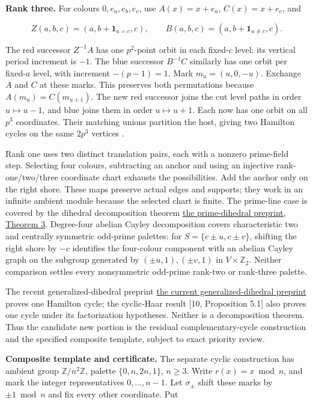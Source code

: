 \documentclass[smallextended]{svjour3}
\begin{document}
\textbf{Rank three.} For colours \(0,e_a,e_b,e_c\), use \(A(x)=x+e_a\),
\(C(x)=x+e_c\), and

\[
Z(a,b,c)=(a,b+\mathbf1_{a=c},c),\qquad
B(a,b,c)=(a,b+\mathbf1_{a\ne c},c).
\]

The red successor \(Z^{-1}A\) has one \(p^2\)-point orbit in each
fixed-\(c\) level: its vertical period increment is \(-1\). The blue
successor \(B^{-1}C\) similarly has one orbit per fixed-\(a\) level,
with increment \(-(p-1)=1\). Mark \(m_u=(u,0,-u)\). Exchange \(A\) and
\(C\) at these marks. This preserves both permutations because
\(A(m_u)=C(m_{u+1})\). The new red successor joins the cut level paths
in order \(u\mapsto u-1\), and blue joins them in order
\(u\mapsto u+1\). Each now has one orbit on all \(p^3\) coordinates.
Their matching unions partition the host, giving two Hamilton cycles on
the same \(2p^3\) vertices \cite{ref11}.

Rank one uses two distinct translation pairs, each with a nonzero
prime-field step. Selecting four colours, subtracting an anchor and
using an injective rank-one/two/three coordinate chart exhausts the
possibilities. Add the anchor only on the right shore. These maps
preserve actual edges and supports; they work in an infinite ambient
module because the selected chart is finite. The prime-line case is
covered by the dihedral decomposition theorem
\href{https://arxiv.org/html/1810.07866v1}{the prime-dihedral preprint,
Theorem 3}. Degree-four abelian Cayley decomposition \cite{ref6} covers
characteristic two and centrally symmetric odd-prime palettes: for
\(S=\{c\pm u,c\pm v\}\), shifting the right shore by \(-c\) identifies
the four-colour component with an abelian Cayley graph on the subgroup
generated by \((\pm u,1),(\pm v,1)\) in \(V\times\mathbb Z_2\). Neither
comparison settles every nonsymmetric odd-prime rank-two or rank-three
palette.

The recent generalized-dihedral preprint
\href{https://arxiv.org/html/1810.13311v3}{the current
generalized-dihedral preprint} proves one Hamilton cycle; the
cyclic-Haar result {[}10, Proposition 5.1{]} also proves one cycle under
its factorization hypotheses. Neither is a decomposition theorem. Thus
the candidate new portion is the residual complementary-cycle
construction and the specified composite template, subject to exact
priority review.

\textbf{Composite template and certificate.} The separate cyclic
construction has ambient group \(\mathbb Z/n^2\mathbb Z\), palette
\(\{0,n,2n,1\}\), \(n\ge3\). Write \(r(x)=x\bmod n\), and mark the
integer representatives \(0,\ldots,n-1\). Let \(\sigma_\pm\) shift these
marks by \(\pm1\bmod n\) and fix every other coordinate. Put
\end{document}
